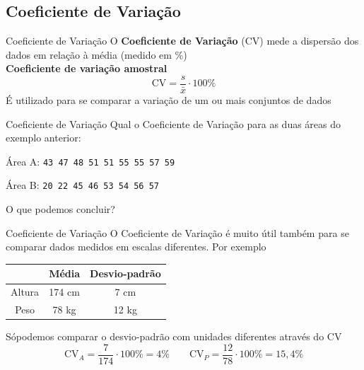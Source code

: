 \documentclass[10pt]{beamer}\usepackage[]{graphicx}\usepackage[]{color}
\theoremstyle{definition}
\begin{document}
\subsection{Coeficiente de Variação}

\begin{frame}{Coeficiente de Variação}
  O \textbf{Coeficiente de Variação} (CV) mede a dispersão dos dados em
  relação à média (medido em \%)\\ \vspace{1em}
\textbf{Coeficiente de variação amostral}
  \begin{equation*}
    \text{CV} = \frac{s}{\bar{x}} \cdot 100\%
  \end{equation*}
  É utilizado para se comparar a variação de um ou mais conjuntos de
  dados
\end{frame}

\begin{frame}{Coeficiente de Variação}
  Qual o Coeficiente de Variação para as duas áreas do exemplo anterior:
  \begin{flushleft}
    Área A: \texttt{43 47 48 51 51 55 55 57 59}
  \end{flushleft}
  \begin{flushleft}
    Área B: \texttt{20 22 45 46 53 54 56 57}
  \end{flushleft}
  O que podemos concluir?
\end{frame}

\begin{frame}{Coeficiente de Variação}
  O Coeficiente de Variação é muito útil também para se comparar dados
  medidos em escalas diferentes. Por exemplo
  \begin{table}[h]
    \centering
    \begin{tabular}{ccc}
      \hline
            & Média & Desvio-padrão \\
            \hline
            Altura & 174 cm & 7 cm \\
            Peso & 78 kg & 12 kg \\
            \hline
    \end{tabular}
  \end{table}
  Sópodemos comparar o desvio-padrão com unidades diferentes através do CV
  \begin{equation*}
    \text{CV}_A = \frac{7}{174} \cdot 100\% =  4\%
    \quad \quad \text{CV}_P = \frac{12}{78} \cdot 100\% = 15,4\%
  \end{equation*}
\end{frame}
\end{document}
